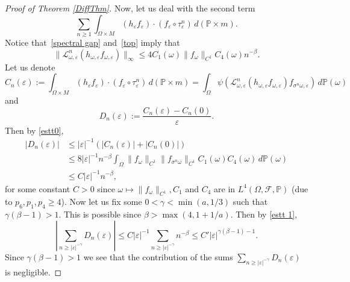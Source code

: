 \documentclass[11pt,reqno,a4paper]{article}
\theoremstyle{special}
\renewcommand{\epsilon}{\varepsilon}
\def\om{\omega}
\begin{document}
\begin{proof}[Proof of Theorem \ref{DiffThm}]
Now, let us deal with the second term 
$$
\sum_{n\ge 1}\int_{\Omega \times M} (h_{\varepsilon} f_{\varepsilon} ) \cdot ( f_{\varepsilon} \circ \tau_\epsilon^n)\, d(\mathbb P\times m).
$$
Notice that~\eqref{spectral gap} and~\eqref{top} imply that 
\begin{equation}\label{estt0}
\|\mathcal L_{\om, \varepsilon}^n(h_{\om, \varepsilon}f_{\om, \varepsilon})\|_\infty \leq 4C_1(\om)\|f_\om\|_{C^1}C_4(\om)n^{-\beta}   .
\end{equation}
Let us denote 
$$
C_n(\varepsilon):=\int_{\Omega \times M} (h_{\varepsilon} f_{\varepsilon}) \cdot (f_{\varepsilon} \circ \tau_\epsilon^n)\, d(\mathbb P\times m)=
\int_\Omega \psi(\mathcal L_{\omega,\varepsilon}^n(h_{\om, \varepsilon}f_{\om, \varepsilon}) f_{\sigma^n\om, \varepsilon})\, d\mathbb P(\om)
$$
and 
$$
D_n(\varepsilon):=\frac{C_n(\varepsilon)-C_n(0)}{\varepsilon}.
$$
Then by \eqref{estt0},
\begin{equation}\label{estt 1}
\begin{split}
 |D_n(\varepsilon)| &\leq  |\varepsilon|^{-1}(|C_n(\varepsilon)|+|C_n(0)|) \\
 &\leq 8|\varepsilon|^{-1}n^{-\beta}\int_\Omega \|f_\om\|_{C^1}\|f_{\sigma^n\om}\|_{C^1} C_1(\omega)C_4(\om)\, d\mathbb P(\om) \\
 &\leq C |\varepsilon|^{-1}n^{-\beta},
 \end{split}
\end{equation}
for some constant $C>0$ since 
  $\omega \mapsto \|f_\om\|_{C^1}, C_1$ and $C_4$ are in $L^4(\Omega,\mathcal F,\mathbb P)$ (due to $p_6,p_1,p_4\geq 4$).
Now let us fix some  $0<\gamma<\min(a,1/3)$ such that $\gamma(\beta-1)>1$. This is possible since $\beta>\max(4,1+1/a)$. Then by \eqref{estt 1},
\begin{equation}\label{esst 2}
\left|\sum_{n\geq |\varepsilon|^{-\gamma}}D_n(\varepsilon)\right|\leq C|\varepsilon|^{-1}\sum_{n \ge |\varepsilon|^{-\gamma}}n^{-\beta}\leq C'|\varepsilon|^{\gamma(\beta-1)-1}.
\end{equation}
Since $\gamma(\beta-1)>1$ we see that the contribution of the sums $\sum_{n\geq |\varepsilon|^{-\gamma}}D_n(\varepsilon)$ is negligible.


\end{proof}
\end{document}
